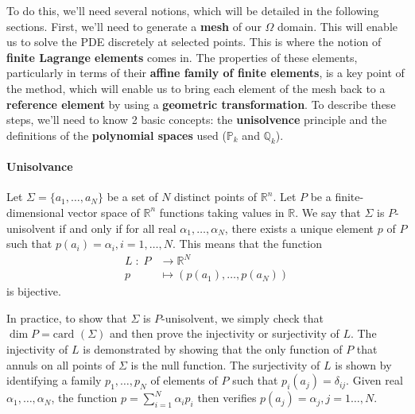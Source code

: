 
To do this, we'll need several notions, which will be detailed in the following sections. First, we'll need to generate a \textbf{mesh} of our $\Omega$ domain. This will enable us to solve the PDE discretely at selected points. This is where the notion of \textbf{finite Lagrange elements} comes in. The properties of these elements, particularly in terms of their \textbf{affine family of finite elements}, is a key point of the method, which will enable us to bring each element of the mesh back to a \textbf{reference element} by using a \textbf{geometric transformation}. To describe these steps, we'll need to know 2 basic concepts: the \textbf{unisolvence} principle and the definitions of the \textbf{polynomial spaces} used ($\mathbb{P}_k$ and $\mathbb{Q}_k$).

\paragraph{Unisolvance}

\begin{Def}
	Let $\Sigma=\{a_1,\dots,a_N\}$ be a set of $N$ distinct points of $\mathbb{R}^n$. Let $P$ be a finite-dimensional vector space of $\mathbb{R}^n$ functions taking values in $\mathbb{R}$. We say that $\Sigma$ is $P$-unisolvent if and only if for all real $\alpha_1,\dots,\alpha_N$, there exists a unique element $p$ of $P$ such that $p(a_i)=\alpha_i,i=1,\dots,N$. 
	This means that the function
	\begin{align*}
		L \; : \; P &\rightarrow \mathbb{R}^N \\
		p &\mapsto(p(a_1),\dots,p(a_N))
	\end{align*}
	is bijective.
\end{Def}

\begin{Rem}
	In practice, to show that $\Sigma$ is $P$-unisolvent, we simply check that $\dim P= \text{card } (\Sigma)$ and then prove the injectivity or surjectivity of $L$. The injectivity of $L$ is demonstrated by showing that the only function of $P$ that annuls on all points of $\Sigma$ is the null function. The surjectivity of $L$ is shown by identifying a family $p_1,\dots,p_N$ of elements of $P$ such that $p_i(a_j)=\delta_{ij}$. Given real $\alpha_1,\dots,\alpha_N$, the function $p=\sum_{i=1}^N\alpha_i p_i$ then verifies $p(a_j)=\alpha_j,j=1\dots,N$. 
\end{Rem}

